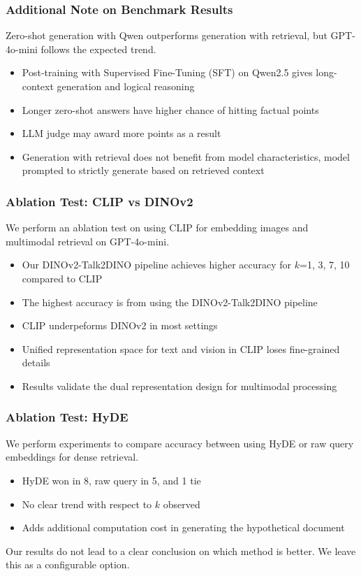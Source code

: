 \documentclass[aspectratio=1610]{beamer}
\begin{document}
    \begin{frame}
        \frametitle{Additional Note on Benchmark Results}
        Zero-shot generation with Qwen outperforms generation with retrieval, but GPT-4o-mini follows the expected trend.
        \begin{itemize}
            \item Post-training with Supervised Fine-Tuning (SFT) on Qwen2.5 gives long-context generation and logical reasoning
            \item Longer zero-shot answers have higher chance of hitting factual points
            \item LLM judge may award more points as a result
            \item Generation with retrieval does not benefit from model characteristics, model prompted to strictly generate based on retrieved context
        \end{itemize}
    \end{frame}

    \begin{frame}
        \frametitle{Ablation Test: CLIP vs DINOv2}
        We perform an ablation test on using CLIP for embedding images and multimodal retrieval on GPT-4o-mini.
        \begin{itemize}
            \item Our DINOv2-Talk2DINO pipeline achieves higher accuracy for $k$=1, 3, 7, 10 compared to CLIP
            \item The highest accuracy is from using the DINOv2-Talk2DINO pipeline
            \item CLIP underpeforms DINOv2 in most settings
            \item Unified representation space for text and vision in CLIP loses fine-grained details
            \item Results validate the dual representation design for multimodal processing
        \end{itemize}
    \end{frame}

    \begin{frame}
        \frametitle{Ablation Test: HyDE}
        We perform experiments to compare accuracy between using HyDE or raw query embeddings for dense retrieval.
        \begin{itemize}
            \item HyDE won in 8, raw query in 5, and 1 tie
            \item No clear trend with respect to $k$ observed
            \item Adds additional computation cost in generating the hypothetical document
        \end{itemize}

        Our results do not lead to a clear conclusion on which method is better.
        We leave this as a configurable option.
    \end{frame}
\end{document}
